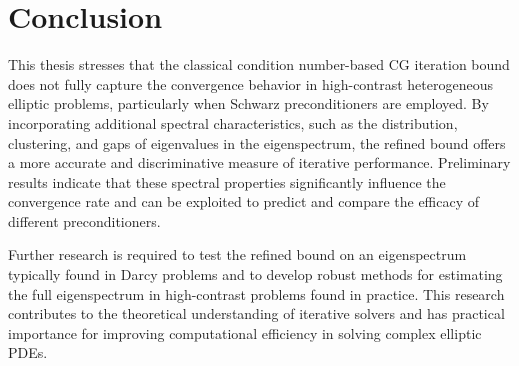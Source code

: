 \chapter{Conclusion}\label{ch:conclusion}\newpage
This thesis stresses that the classical condition number-based CG iteration bound does not fully capture the convergence behavior in high-contrast heterogeneous elliptic problems, particularly when Schwarz preconditioners are employed. By incorporating additional spectral characteristics, such as the distribution, clustering, and gaps of eigenvalues in the eigenspectrum, the refined bound offers a more accurate and discriminative measure of iterative performance. Preliminary results indicate that these spectral properties significantly influence the convergence rate and can be exploited to predict and compare the efficacy of different preconditioners. 

Further research is required to test the refined bound on an eigenspectrum typically found in Darcy problems and to develop robust methods for estimating the full eigenspectrum in high-contrast problems found in practice. This research contributes to the theoretical understanding of iterative solvers and has practical importance for improving computational efficiency in solving complex elliptic PDEs.